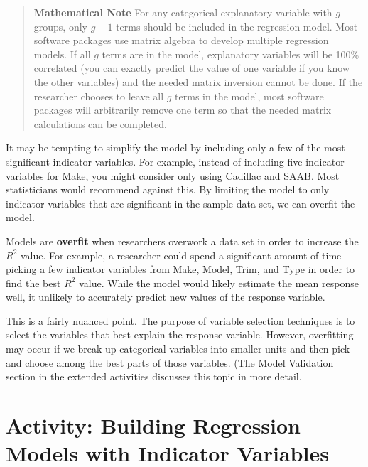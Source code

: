 \documentclass[
]{report}
\begin{document}
\begin{quote}
\textbf{Mathematical Note}
For any categorical explanatory variable with \(g\) groups, only \(g - 1\) terms should be included in the regression model. Most software packages use matrix algebra to develop multiple regression models. If all \(g\) terms are in the model, explanatory variables will be 100\% correlated (you can exactly predict the value of one variable if you know the other variables) and the needed matrix inversion cannot be done. If the researcher chooses to leave all \(g\) terms in the model, most software packages will arbitrarily remove one term so that the needed matrix calculations can be completed.
\end{quote}

It may be tempting to simplify the model by including only a few of the most significant indicator variables. For example, instead of including five indicator variables for Make, you might consider only using Cadillac and SAAB. Most statisticians would recommend against this. By limiting the model to only indicator variables that are significant in the sample data set, we can overfit the model.

Models are \textbf{overfit} when researchers overwork a data set in order to increase the \(R^2\) value. For example, a researcher could spend a significant amount of time picking a few indicator variables from Make, Model, Trim, and Type in order to find the best \(R^2\) value. While the model would likely estimate the mean response well, it unlikely to accurately predict new values of the response variable.

This is a fairly nuanced point. The purpose of variable selection techniques is to select the variables that best explain the response variable. However, overfitting may occur if we break up categorical variables into smaller units and then pick and choose among the best parts of those variables. (The Model Validation section
in the extended activities discusses this topic in more detail.

\hypertarget{activity-building-regression-models-with-indicator-variables}{%
\section*{Activity: Building Regression Models with Indicator Variables}\label{activity-building-regression-models-with-indicator-variables}}
\end{document}
